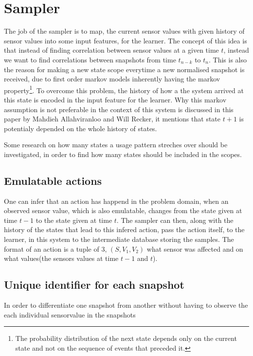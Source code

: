 \section{Sampler}

The job of the sampler is to map, the current sensor values with given history of sensor values into some input features, for the learner.
The concept of this idea is that instead of finding correlation between sensor values at a given time $t$, instead we want to find correlations between snapshots from time $t_{n-k}$ to $t_n$. This is also the reason for making a new state scope everytime a new normalised snapshot is received, due to first order markov models inherently having the markov property\footnote{The probability distribution of the next state depends only on the current state and not on the sequence of events that preceded it.\cite{wiki_markov_chain}}. To overcome this problem, the history of how a the system arrived at this state is encoded in the input feature for the learner. Why this markov assumption is not preferable in the context of this system is discussed in this paper\cite{Allahviranloo201316} by Mahdieh Allahviranloo and Will Recker, it mentions that state $t+1$ is potentialy depended on the whole history of states.

Some research on how many states a usage pattern streches over should be investigated, in order to find how many states should be included in the scopes.

\subsection{Emulatable actions}
One can infer that an action has happend in the problem domain, when an observed sensor value, which is also emulatable, changes from the state given at time $t-1$ to the state given at time $t$. The sampler can then, along with the history of the states that lead to this infered action, pass the action itself, to the learner, in this system to the intermediate database storing the samples. The format of an action is a tuple of 3, $(S,V_1,V_2)$ what sensor was affected and on what values(the sensors values at time $t-1$ and $t$).

\subsection{Unique identifier for each snapshot}

In order to differentiate one snapshot from another without having to observe the each individual sensorvalue in the snapshots

